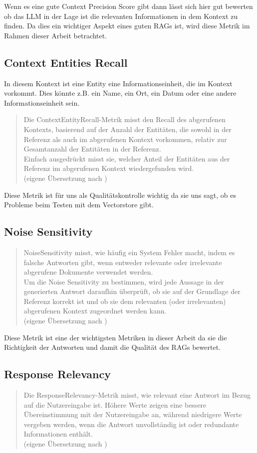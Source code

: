 Wenn es eine gute Context Precision Score gibt dann lässt sich hier gut bewerten ob das LLM in der Lage ist die relevanten Informationen in dem Kontext zu finden.
Da dies ein wichtiger Aspekt eines guten RAGs ist, wird diese Metrik im Rahmen dieser Arbeit betrachtet.

\subsection{Context Entities Recall}
In diesem Kontext ist eine Entity eine Informationseinheit, die im Kontext vorkommt.
Dies könnte z.B. ein Name, ein Ort, ein Datum oder eine andere Informationseinheit sein.

\begin{quote}
Die ContextEntityRecall-Metrik misst den Recall des abgerufenen Kontexts, basierend auf der Anzahl der Entitäten, die sowohl in der Referenz als auch im abgerufenen Kontext vorkommen, relativ zur Gesamtanzahl der Entitäten in der Referenz.\\
Einfach ausgedrückt misst sie, welcher Anteil der Entitäten aus der Referenz im abgerufenen Kontext wiedergefunden wird.\\
(eigene Übersetzung nach \cite{ragas_context_entities_recall})
\end{quote}
Diese Metrik ist für uns als Qualitätskontrolle wichtig da sie uns sagt, ob es Probleme beim Testen mit dem Vectorstore gibt.

\subsection{Noise Sensitivity}
\begin{quote}
NoiseSensitivity misst, wie häufig ein System Fehler macht, indem es falsche Antworten gibt, wenn entweder relevante oder irrelevante abgerufene Dokumente verwendet werden.\\
Um die Noise Sensitivity zu bestimmen, wird jede Aussage in der generierten Antwort daraufhin überprüft, ob sie auf der Grundlage der Referenz korrekt ist und ob sie dem relevanten (oder irrelevanten) abgerufenen Kontext zugeordnet werden kann.\\
(eigene Übersetzung nach \cite{ragas_noise_sensitivity})
\end{quote}
Diese Metrik ist eine der wichtigsten Metriken in dieser Arbeit da sie die Richtigkeit der Antworten und damit die Qualität des RAGs bewertet.

\subsection{Response Relevancy}
\begin{quote}
Die ResponseRelevancy-Metrik misst, wie relevant eine Antwort im Bezug auf die Nutzereingabe ist. Höhere Werte zeigen eine bessere Übereinstimmung mit der Nutzereingabe an, während niedrigere Werte vergeben werden, wenn die Antwort unvollständig ist oder redundante Informationen enthält.\\
(eigene Übersetzung nach \cite{ragas_response_relevancy})
\end{quote}

